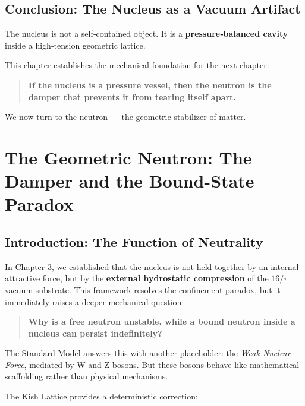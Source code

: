 \documentclass[11pt, letterpaper, openany]{book}
\begin{document}
\section{Conclusion: The Nucleus as a Vacuum Artifact}

The nucleus is not a self‑contained object.  
It is a \textbf{pressure‑balanced cavity} inside a high‑tension geometric lattice.

This chapter establishes the mechanical foundation for the next chapter:

\begin{quote}
\textbf{If the nucleus is a pressure vessel, then the neutron is the damper that prevents it from tearing itself apart.}
\end{quote}

We now turn to the neutron — the geometric stabilizer of matter.


\chapter{The Geometric Neutron: The Damper and the Bound-State Paradox}
\label{ch:geometric_neutron}

\section{Introduction: The Function of Neutrality}

In Chapter 3, we established that the nucleus is not held together by an internal attractive force, but by the \textbf{external hydrostatic compression} of the $16/\pi$ vacuum substrate.  
This framework resolves the confinement paradox, but it immediately raises a deeper mechanical question:

\begin{quote}
\textbf{Why is a free neutron unstable, while a bound neutron inside a nucleus can persist indefinitely?}
\end{quote}

The Standard Model answers this with another placeholder: the \textit{Weak Nuclear Force}, mediated by W and Z bosons.  
But these bosons behave like mathematical scaffolding rather than physical mechanisms.

The Kish Lattice provides a deterministic correction:
\end{document}
